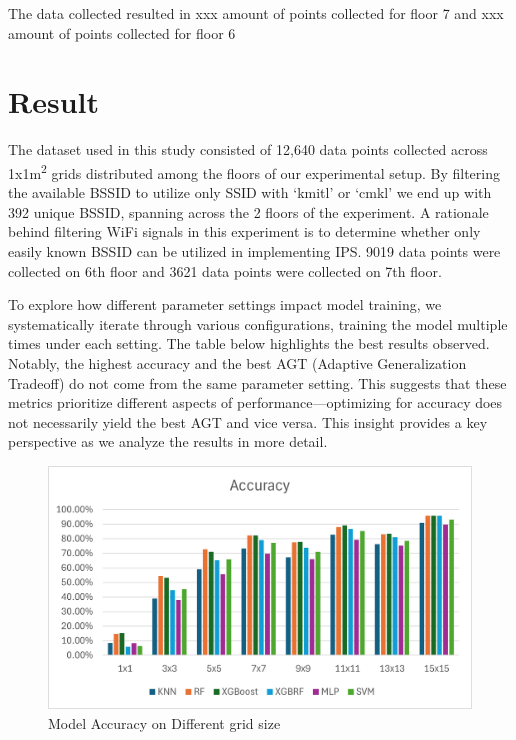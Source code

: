 \documentclass[conference]{IEEEtran}
\begin{document}
	
	The data collected resulted in xxx amount of points collected for floor 7 and xxx amount of points collected for floor 6
	
	
	
	\section{Result}
	The dataset used in this study consisted of 12,640 data points collected across 1x1m\textsuperscript{2} grids distributed among the floors of our experimental setup. By filtering the available BSSID to utilize only SSID with ‘kmitl’ or ‘cmkl’ we end up with 392 unique BSSID, spanning across the 2 floors of the experiment. A rationale behind filtering WiFi signals in this experiment is to determine whether only easily known BSSID can be utilized in implementing IPS. 9019 data points were collected on 6th floor and 3621 data points were collected on 7th floor.
	
	To explore how different parameter settings impact model training, we systematically iterate through various configurations, training the model multiple times under each setting. The table below highlights the best results observed. Notably, the highest accuracy and the best AGT (Adaptive Generalization Tradeoff) do not come from the same parameter setting. This suggests that these metrics prioritize different aspects of performance—optimizing for accuracy does not necessarily yield the best AGT and vice versa. This insight provides a key perspective as we analyze the results in more detail.
	
	\begin{figure}[htbp]
		\centerline{\includegraphics[scale=0.65]{image3.png}}
		\caption{Model Accuracy on Different grid size}
		\label{fig3}
	\end{figure}
	
\end{document}

